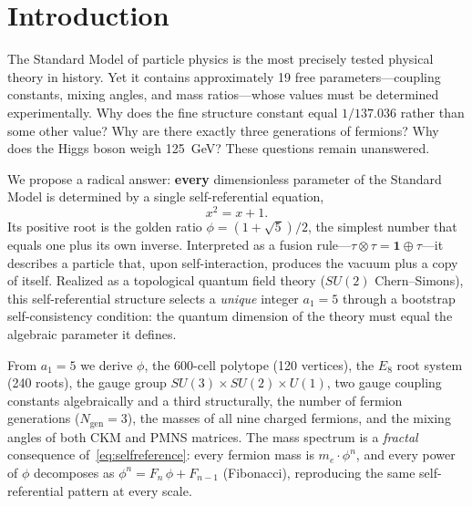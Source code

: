 \documentclass[12pt,a4paper]{article}
\theoremstyle{definition}
\begin{document}
\begin{abstract}
\emph{Provenance-qualified tests:} measured mixing angles, oscillation
splittings, the leptonic CP best fit, and the Higgs/coupling/mass agreements
are retrodictions: their comparison values were public before these formulae
were fixed.  The genuinely blind neutrino assets are $m_1=0$, strict normal
ordering, $\sum m_\nu=0.058$~eV, $m_\beta\simeq8.8$~meV, and the
phase-specific $m_{\beta\beta}\simeq3.1$--$3.5$~meV.  The complete
chronology is in \texttt{prediction\_provenance\_ledger.md}.
\end{abstract}

\tableofcontents
\newpage

\section{Introduction}

The Standard Model of particle physics is the most precisely tested physical theory in history. Yet it contains approximately 19 free parameters---coupling constants, mixing angles, and mass ratios---whose values must be determined experimentally. Why does the fine structure constant equal $1/137.036$ rather than some other value? Why are there exactly three generations of fermions? Why does the Higgs boson weigh 125~GeV? These questions remain unanswered.

We propose a radical answer: \textbf{every} dimensionless parameter of the Standard Model is determined by a single self-referential equation,
\begin{equation}
x^2 = x + 1.
\label{eq:selfreference}
\end{equation}
Its positive root is the golden ratio $\phi = (1+\sqrt{5})/2$, the simplest number that equals one plus its own inverse.  Interpreted as a fusion rule---$\tau \otimes \tau = \mathbf{1} \oplus \tau$---it describes a particle that, upon self-interaction, produces the vacuum plus a copy of itself.  Realized as a topological quantum field theory ($SU(2)$ Chern--Simons), this self-referential structure selects a \emph{unique} integer $a_1 = 5$ through a bootstrap self-consistency condition: the quantum dimension of the theory must equal the algebraic parameter it defines.

From $a_1 = 5$ we derive $\phi$, the 600-cell polytope (120 vertices), the $E_8$ root system (240 roots), the gauge group $SU(3) \times SU(2) \times U(1)$, two gauge coupling constants algebraically and a third structurally, the number of fermion generations ($N_{\text{gen}} = 3$), the masses of all nine charged fermions, and the mixing angles of both CKM and PMNS matrices.  The mass spectrum is a \emph{fractal} consequence of~\eqref{eq:selfreference}: every fermion mass is $m_e \cdot \phi^n$, and every power of $\phi$ decomposes as $\phi^n = F_n\,\phi + F_{n-1}$ (Fibonacci), reproducing the same self-referential pattern at every scale.
\end{document}
